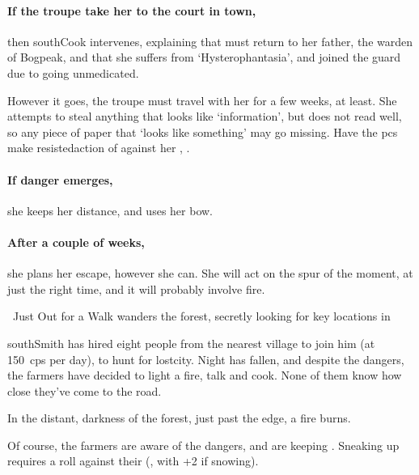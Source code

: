 \paragraph{If the troupe take her to the \gls{court} in \gls{town},}
then \gls{southCook} intervenes, explaining that  must return to her father, the \gls{warden} of Bogpeak, and that she suffers from `Hysterophantasia', and joined the \gls{guard} due to going unmedicated.

However it goes, the troupe must travel with her for a few weeks, at least.
She attempts to steal anything that looks like `information', but does not read well, so any piece of paper that `looks like something' may go missing.
Have the \glspl{pc} make \gls{resistedaction} of  against her , \tn.

\paragraph{If danger emerges,}
she keeps her distance, and uses her bow.

\paragraph{After a couple of weeks,}
she plans her escape, however she can.
She will act on the spur of the moment, at just the right time, and it will probably involve fire.

{~Just Out for a Walk}%
{ wanders the forest, secretly looking for key locations in }%

\begin{exampletext}
  \Gls{southSmith} has hired eight people from the nearest \gls{village} to join him (at 150~\glspl{cp} per day), to hunt for \gls{lostcity}.
  Night has fallen, and despite the dangers, the farmers have decided to light a fire, talk and cook.
  None of them know how close they've come to the road.
\end{exampletext}

\begin{boxtext}
  In the distant, darkness of the forest, just past the \gls{edge}, a fire burns.
\end{boxtext}


Of course, the farmers are aware of the dangers, and are keeping .
Sneaking up requires a  roll against their  (\tn, with +2 if snowing).

